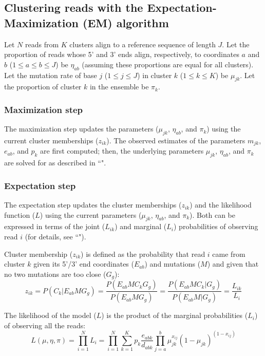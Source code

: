 \documentclass[11pt]{article}
\begin{document}
\subsection{Clustering reads with the Expectation-Maximization (EM) algorithm}
\label{em-clustering}

Let $N$ reads from $K$ clusters align to a reference sequence of length $J$.
Let the proportion of reads whose 5' and 3' ends align, respectively, to coordinates $a$ and $b$ ($1 \le a \le b \le J$) be $\eta_{ab}$ (assuming these proportions are equal for all clusters).
Let the mutation rate of base $j$ ($1 \le j \le J$) in cluster $k$ ($1 \le k \le K$) be $\mu_{jk}$.
Let the proportion of cluster $k$ in the ensemble be $\pi_k$.

\subsubsection{Maximization step}
\label{maximization-step}

The maximization step updates the parameters ($\mu_{jk}$, $\eta_{ab}$, and $\pi_k$) using the current cluster memberships ($z_{ik}$).
The observed estimates of the parameters $m_{jk}$, $e_{ab}$, and $p_k$ are first computed; then, the underlying parameters $\mu_{jk}$, $\eta_{ab}$, and $\pi_k$ are solved for as described in ``".

\subsubsection{Expectation step}
\label{expectation-step}

The expectation step updates the cluster memberships ($z_{ik}$) and the likelihood function ($L$) using the current parameters ($\mu_{jk}$, $\eta_{ab}$, and $\pi_k$).
Both can be expressed in terms of the joint ($L_{ik}$) and marginal ($L_i$) probabilities of observing read $i$ (for details, see ``").

Cluster membership ($z_{ik}$) is defined as the probability that read $i$ came from cluster $k$ given its 5'/3' end coordinates ($E_{ab}$) and mutations ($M$) and given that no two mutations are too close ($G_g$):
$$z_{ik} = P(C_k | E_{ab} M G_g) = \frac{P(E_{ab} M C_k G_g)}{P(E_{ab} M G_g)} = \frac{P(E_{ab} M C_k | G_g)}{P(E_{ab} M | G_g)} = \frac{L_{ik}}{L_i}$$

The likelihood of the model ($L$) is the product of the marginal probabilities ($L_i$) of observing all the reads:
$$L(\mu, \eta, \pi) = \prod_{i=1}^{N} L_i = \prod_{i=1}^{N} \sum_{k=1}^{K} p_k \frac{e_{abk}}{d_{abk}} \prod_{j=a}^{b} \mu_{jk}^{x_{ij}} (1 - \mu_{jk})^{(1 - x_{ij})}$$
\end{document}
